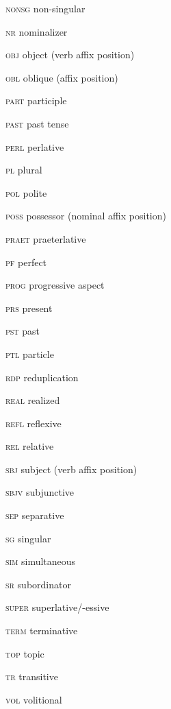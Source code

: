 \begin{refsection}
\begin{multicols}{2}
	\textsc{nonsg}  non-singular
	
	\textsc{nr}  nominalizer
	
	\textsc{obj}  object (verb affix position)
	
	\textsc{obl}  oblique (affix position)
	
	\textsc{part}  participle
	
	\textsc{past}  past tense
	
	\textsc{perl}  perlative
	
	\textsc{pl}  plural
	
	\textsc{pol}  polite
	
	\textsc{poss}  possessor (nominal affix position)
	
	\textsc{praet}  praeterlative
	
	\textsc{pf}  perfect
	
	\textsc{prog}  progressive aspect
	
	\textsc{prs}  present
	
	\textsc{pst}  past
	
	\textsc{ptl}  particle
	
	\textsc{rdp}  reduplication
	
	\textsc{real}  realized
	
	\textsc{refl}  reflexive
	
	\textsc{rel}  relative
	
	\textsc{sbj}  subject (verb affix position)
	
	\textsc{sbjv}  subjunctive
	
	\textsc{sep}  separative
	
	\textsc{sg}  singular
	
	\textsc{sim}  simultaneous
	
	\textsc{sr}  subordinator
	
	\textsc{super}  superlative/-essive
	
	\textsc{term}  terminative
	
	\textsc{top}  topic
	
	\textsc{tr}  transitive
	
	\textsc{vol}  volitional
\end{multicols}

\printbibliography[heading=subbibliography]
\end{refsection}

